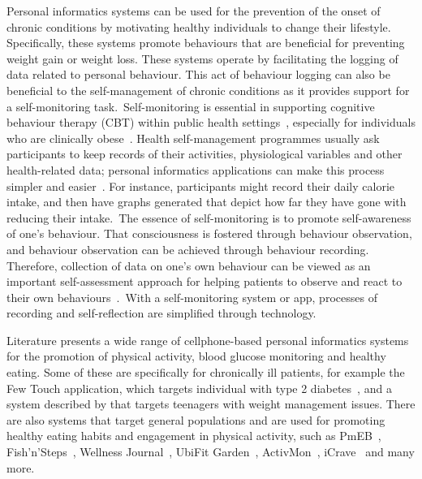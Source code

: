 Personal informatics systems can be used for the prevention of the onset of chronic conditions by motivating healthy individuals to change their lifestyle. Specifically, these systems promote behaviours that are beneficial for preventing weight gain or weight loss. These systems operate by facilitating the logging of data related to personal behaviour. This act of behaviour logging can also be beneficial to the self-management of chronic conditions as it provides support for a self-monitoring task.~Self-monitoring is essential in supporting cognitive behaviour therapy (CBT) within public health settings~\citep{mattila2008mobile}, especially for individuals who are clinically obese~\citep{nih2000practical}. Health self-management programmes usually ask participants to keep records of their activities, physiological variables and other health-related data; personal informatics applications can make this process simpler and easier~\citep{medynskiy2010salud}. For instance, participants might record their daily calorie intake, and then have graphs generated that depict how far they have gone with reducing their intake.~The essence of self-monitoring is to promote self-awareness of one’s behaviour. That consciousness is fostered through behaviour observation, and behaviour observation can be achieved through behaviour recording. Therefore, collection of data on one's own behaviour can be viewed as an important self-assessment approach for helping patients to observe and react to their own behaviours~\citep{rapp2014meaningful}.~With a self-monitoring system or app, processes of recording and self-reflection are simplified through technology. 

Literature presents a wide range of cellphone-based personal informatics systems for the promotion of physical activity, blood glucose monitoring and healthy eating. Some of these are specifically for chronically ill patients, for example the Few Touch application, which targets individual with  type 2 diabetes~\citep{arsand:mobile}, and a system described by \cite{arteaga2010:persuasive} that targets teenagers with weight management issues. There are also systems that target general populations and are used for promoting healthy eating habits and engagement in physical activity,  such as PmEB~\citep{lee2006pmeb}, Fish'n'Steps~\citep{lin2006:fish}, Wellness Journal~\citep{mattila2008mobile}, UbiFit Garden~\citep{consolvo2008activity,klasnja2009:using}, ActivMon~\citep{burns2012using}, iCrave~\citep{hsu2014persuasive} and many more. 

